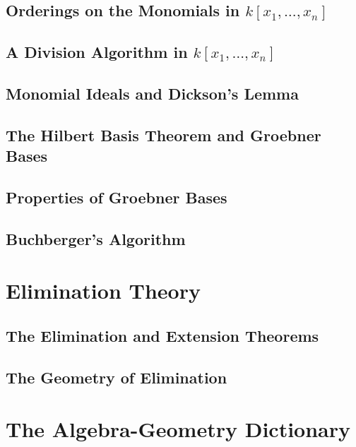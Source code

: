 \documentclass[10pt]{amsart}
\begin{document}
\begin{multicols*}{2}
\subsection{Orderings on the Monomials in $k[x_1, \dots , x_n]$ }




\subsection{A Division Algorithm in $k[x_1, \dots , x_n ]$ }



\subsection{Monomial Ideals and Dickson's Lemma }


\subsection{The Hilbert Basis Theorem and Groebner Bases}


\subsection{Properties of Groebner Bases}



\subsection{Buchberger's Algorithm}






\section{Elimination Theory}



\subsection{The Elimination and Extension Theorems}


\subsection{The Geometry of Elimination}



\section{The Algebra-Geometry Dictionary}



\end{multicols*}
\end{document}
